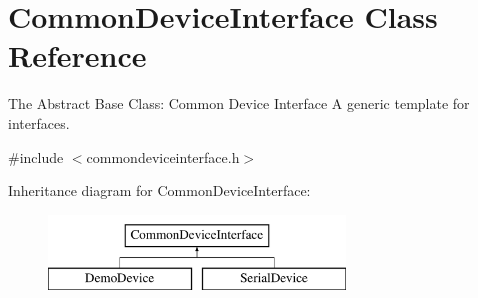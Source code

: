 \hypertarget{class_common_device_interface}{}\section{Common\+Device\+Interface Class Reference}
\label{class_common_device_interface}


The Abstract Base Class\+: Common Device Interface A generic template for interfaces.  




{\ttfamily \#include $<$commondeviceinterface.\+h$>$}

Inheritance diagram for Common\+Device\+Interface\+:\begin{figure}[H]
\begin{center}
\leavevmode
\includegraphics[height=2.000000cm]{class_common_device_interface}
\end{center}
\end{figure}
